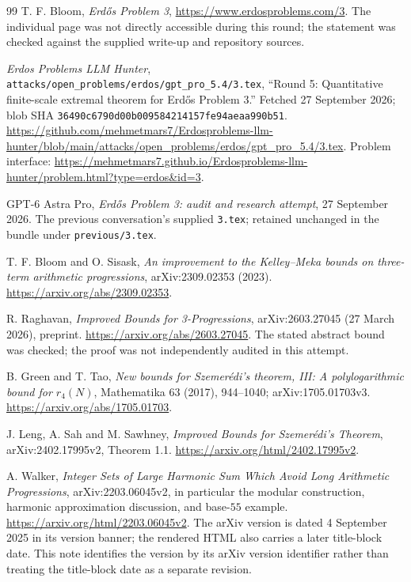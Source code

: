 \begin{thebibliography}{99}
T. F. Bloom, \emph{Erd\H{o}s Problem 3},
\url{https://www.erdosproblems.com/3}.
The individual page was not directly accessible during this round; the statement was checked against the supplied write-up and repository sources.

\emph{Erdos Problems LLM Hunter},
\texttt{attacks/open\_problems/erdos/gpt\_pro\_5.4/3.tex},
``Round 5: Quantitative finite-scale extremal theorem for Erd\H{o}s Problem 3.''
Fetched 27 September 2026; blob SHA
\texttt{36490c6790d00b009584214157fe94aeaa990b51}.
\url{https://github.com/mehmetmars7/Erdosproblems-llm-hunter/blob/main/attacks/open_problems/erdos/gpt_pro_5.4/3.tex}.
Problem interface:
\url{https://mehmetmars7.github.io/Erdosproblems-llm-hunter/problem.html?type=erdos&id=3}.

GPT-6 Astra Pro, \emph{Erd\H{o}s Problem 3: audit and research attempt},
27 September 2026. The previous conversation's supplied \texttt{3.tex}; retained unchanged in the bundle under \texttt{previous/3.tex}.

T. F. Bloom and O. Sisask,
\emph{An improvement to the Kelley--Meka bounds on three-term arithmetic progressions},
arXiv:2309.02353 (2023).
\url{https://arxiv.org/abs/2309.02353}.

R. Raghavan, \emph{Improved Bounds for 3-Progressions},
arXiv:2603.27045 (27 March 2026), preprint.
\url{https://arxiv.org/abs/2603.27045}.
The stated abstract bound was checked; the proof was not independently audited in this attempt.

B. Green and T. Tao,
\emph{New bounds for Szemer\'edi's theorem, III: A polylogarithmic bound for $r_4(N)$},
Mathematika 63 (2017), 944--1040; arXiv:1705.01703v3.
\url{https://arxiv.org/abs/1705.01703}.

J. Leng, A. Sah and M. Sawhney,
\emph{Improved Bounds for Szemer\'edi's Theorem},
arXiv:2402.17995v2, Theorem 1.1.
\url{https://arxiv.org/html/2402.17995v2}.

A. Walker, \emph{Integer Sets of Large Harmonic Sum Which Avoid Long Arithmetic Progressions},
arXiv:2203.06045v2, in particular the modular construction, harmonic approximation discussion, and base-$55$ example.
\url{https://arxiv.org/html/2203.06045v2}.
The arXiv version is dated 4 September 2025 in its version banner; the rendered HTML also carries a later title-block date. This note identifies the version by its arXiv version identifier rather than treating the title-block date as a separate revision.
\end{thebibliography}
